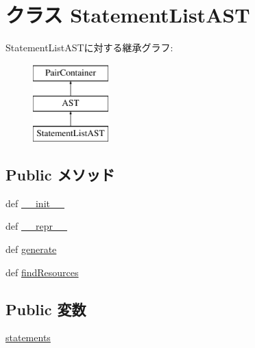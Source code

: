 \hypertarget{classslicc_1_1ast_1_1StatementListAST_1_1StatementListAST}{
\section{クラス StatementListAST}
\label{classslicc_1_1ast_1_1StatementListAST_1_1StatementListAST}
}
StatementListASTに対する継承グラフ:\begin{figure}[H]
\begin{center}
\leavevmode
\includegraphics[height=3cm]{classslicc_1_1ast_1_1StatementListAST_1_1StatementListAST}
\end{center}
\end{figure}
\subsection*{Public メソッド}
\begin{DoxyCompactItemize}
\item 
def \hyperlink{classslicc_1_1ast_1_1StatementListAST_1_1StatementListAST_ac775ee34451fdfa742b318538164070e}{\_\-\_\-init\_\-\_\-}
\item 
def \hyperlink{classslicc_1_1ast_1_1StatementListAST_1_1StatementListAST_ad8b9328939df072e4740cd9a63189744}{\_\-\_\-repr\_\-\_\-}
\item 
def \hyperlink{classslicc_1_1ast_1_1StatementListAST_1_1StatementListAST_a4555d1cee0dccf3942ea35fe86de2e8e}{generate}
\item 
def \hyperlink{classslicc_1_1ast_1_1StatementListAST_1_1StatementListAST_abd195c795639b490ba2de4c1246105f1}{findResources}
\end{DoxyCompactItemize}
\subsection*{Public 変数}
\begin{DoxyCompactItemize}
\item 
\hyperlink{classslicc_1_1ast_1_1StatementListAST_1_1StatementListAST_aa25d5649a404c698dcacaa271a285c92}{statements}
\end{DoxyCompactItemize}


